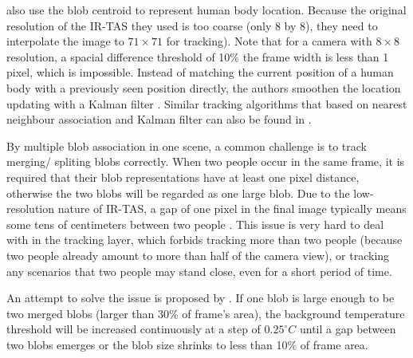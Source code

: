 \citeauthor{mika} \cite{mika} also use the blob centroid to represent human body location. Because the original resolution of the IR-TAS they used is too coarse (only 8 by 8), they need to interpolate the image to $71\times71$ for tracking). Note that for a camera with $8\times8$ resolution, a spacial difference threshold of 10\% the frame width is less than 1 pixel, which is impossible. Instead of matching the current position of a human body with a previously seen position directly, the authors smoothen the location updating with a Kalman filter \cite{kalmanfilter}. Similar tracking algorithms that based on nearest neighbour association and Kalman filter can also be found in \cite{melexis,virtualtrack}.

By multiple blob association in one scene, a common challenge is to track merging/ spliting blobs correctly. When two people occur in the same frame, it is required that their blob representations have at least one pixel distance, otherwise the two blobs will be regarded as one large blob. Due to the low-resolution nature of IR-TAS, a gap of one pixel in the final image typically means some tens of centimeters between two people \cite{mika}. This issue is very hard to deal with in the tracking layer, which forbids tracking more than two people (because two people already amount to more than half of the camera view), or tracking any scenarios that two people may stand close, even for a short period of time.

An attempt to solve the issue is proposed by \cite{firstflow}. If one blob is large enough to be two merged blobs (larger than 30\% of frame's area), the background temperature threshold will be increased continuously at a step of $0.25^\circ C$ until a gap between two blobs emerges or the blob size shrinks to less than 10\% of frame area.

